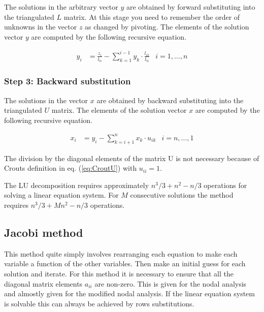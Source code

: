 The solutions in the arbitrary vector $y$ are obtained by forward
substituting into the triangulated $L$ matrix.  At this stage you need
to remember the order of unknowns in the vector $z$ as changed by
pivoting.  The elements of the solution vector $y$ are computed by the
following recursive equation.

\begin{align}
y_{i} &= \frac{z_{i}}{l_{ii}} - \sum_{k=1}^{i-1} y_{k}\cdot \frac{l_{ik}}{l_{ii}} & i = 1,\ldots,n
\end{align}

\subsubsection{Step 3: Backward substitution}

The solutions in the vector $x$ are obtained by backward substituting
into the triangulated $U$ matrix.  The elements of the solution vector
$x$ are computed by the following recursive equation.

\begin{align}
x_{i} &= y_{i} - \sum_{k=i+1}^{n} x_{k}\cdot u_{ik} & i = n,\ldots,1
\end{align}

The division by the diagonal elements of the matrix U is not necessary
because of Crouts definition in eq. (\ref{eq:CroutU}) with $u_{ii} =
1$.

\addvspace{12pt}

The LU decomposition requires approximately $n^3/3 + n^2 - n/3$
operations for solving a linear equation system.  For $M$ consecutive
solutions the method requires $n^3/3 + Mn^2 - n/3$ operations.

\subsection{Jacobi method}

This method quite simply involves rearranging each equation to make
each variable a function of the other variables.  Then make an initial
guess for each solution and iterate.  For this method it is necessary
to ensure that all the diagonal matrix elements $a_{ii}$ are non-zero.
This is given for the nodal analysis and almostly given for the
modified nodal analysis.  If the linear equation system is solvable
this can always be achieved by rows substitutions.

